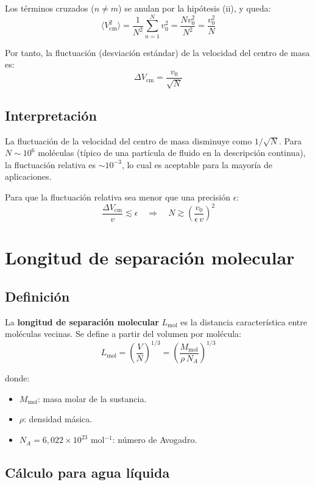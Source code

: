 Los términos cruzados ($n \neq m$) se anulan por la hipótesis (ii), y queda:
$$
\langle V_{\text{cm}}^2 \rangle = \frac{1}{N^2}\sum_{n=1}^N v_0^2 = \frac{N v_0^2}{N^2} = \frac{v_0^2}{N}
$$

Por tanto, la fluctuación (desviación estándar) de la velocidad del centro de masa es:
$$
\boxed{\Delta V_{\text{cm}} = \frac{v_0}{\sqrt{N}}}
$$

\subsection{Interpretación}

La fluctuación de la velocidad del centro de masa disminuye como $1/\sqrt{N}$. Para $N \sim 10^6$ moléculas (típico de una partícula de fluido en la descripción continua), la fluctuación relativa es $\sim 10^{-3}$, lo cual es aceptable para la mayoría de aplicaciones.

Para que la fluctuación relativa sea menor que una precisión $\epsilon$:
$$
\frac{\Delta V_{\text{cm}}}{v} \lesssim \epsilon \quad \Longrightarrow \quad N \gtrsim \left(\frac{v_0}{\epsilon\, v}\right)^2
$$

\section{Longitud de separación molecular}

\subsection{Definición}

La \textbf{longitud de separación molecular} $L_{\text{mol}}$ es la distancia característica entre moléculas vecinas. Se define a partir del volumen por molécula:
$$
L_{\text{mol}} = \left(\frac{V}{N}\right)^{1/3} = \left(\frac{M_{\text{mol}}}{\rho\, N_A}\right)^{1/3}
$$

donde:
\begin{itemize}
    \item $M_{\text{mol}}$: masa molar de la sustancia.
    \item $\rho$: densidad másica.
    \item $N_A = 6{,}022 \times 10^{23}$ mol$^{-1}$: número de Avogadro.
\end{itemize}

\subsection{Cálculo para agua líquida}

